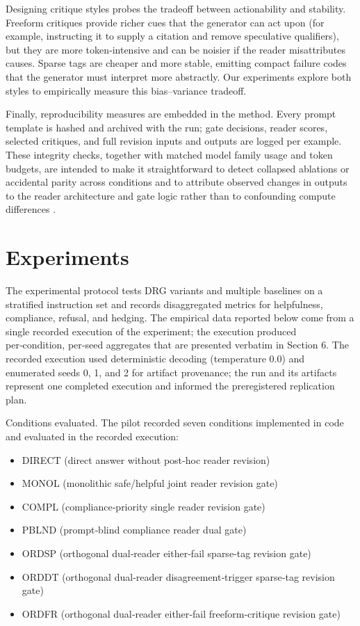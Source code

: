 \documentclass{article}
\begin{document}
Designing critique styles probes the tradeoff between actionability and stability. Freeform critiques provide richer cues that the generator can act upon (for example, instructing it to supply a citation and remove speculative qualifiers), but they are more token‑intensive and can be noisier if the reader misattributes causes. Sparse tags are cheaper and more stable, emitting compact failure codes that the generator must interpret more abstractly. Our experiments explore both styles to empirically measure this bias--variance tradeoff.

Finally, reproducibility measures are embedded in the method. Every prompt template is hashed and archived with the run; gate decisions, reader scores, selected critiques, and full revision inputs and outputs are logged per example. These integrity checks, together with matched model family usage and token budgets, are intended to make it straightforward to detect collapsed ablations or accidental parity across conditions and to attribute observed changes in outputs to the reader architecture and gate logic rather than to confounding compute differences \cite{liu2024reife}.

\section{Experiments}

\label{sec:experiments}

The experimental protocol tests DRG variants and multiple baselines on a stratified instruction set and records disaggregated metrics for helpfulness, compliance, refusal, and hedging. The empirical data reported below come from a single recorded execution of the experiment; the execution produced per‑condition, per‑seed aggregates that are presented verbatim in Section 6. The recorded execution used deterministic decoding (temperature 0.0) and enumerated seeds 0, 1, and 2 for artifact provenance; the run and its artifacts represent one completed execution and informed the preregistered replication plan.

Conditions evaluated. The pilot recorded seven conditions implemented in code and evaluated in the recorded execution:
\begin{itemize}
 \item DIRECT (direct answer without post‑hoc reader revision)
 \item MONOL (monolithic safe/helpful joint reader revision gate)
 \item COMPL (compliance‑priority single reader revision gate)
 \item PBLND (prompt‑blind compliance reader dual gate)
 \item ORDSP (orthogonal dual‑reader either‑fail sparse‑tag revision gate)
 \item ORDDT (orthogonal dual‑reader disagreement‑trigger sparse‑tag revision gate)
 \item ORDFR (orthogonal dual‑reader either‑fail freeform‑critique revision gate)
\end{itemize}
\end{document}

